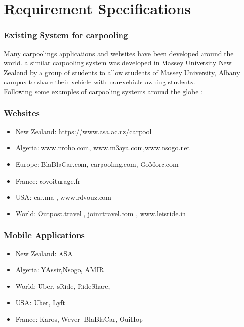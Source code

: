 \chapter{Requirement Specifications} \label{chap:reqs}

\subsection{Existing System for carpooling}
\justify
Many carpoolings applications and websites have been developed around the world. a similar carpooling system was developed in Massey University New Zealand by a group of students to allow students of Massey University, Albany campus to share their vehicle with non-vehicle owning students.
\\ Following some examples of carpooling systems around the globe : 

\subsection{Websites}
\begin{itemize}

\item New Zealand: https://www.asa.ac.nz/carpool
\item Algeria: www.nroho.com, www.m3aya.com,www.nsogo.net
\item Europe: BlaBlaCar.com, carpooling.com, GoMore.com
\item France: covoiturage.fr
\item USA: car.ma , www.rdvouz.com
\item World: Outpost.travel , joinntravel.com , www.letsride.in

\end{itemize}

\subsection{Mobile Applications}
\begin{itemize}

\item New Zealand: ASA
\item Algeria: YAssir,Nsogo, AMIR
\item World: Uber, sRide, RideShare, 
\item USA: Uber, Lyft
\item France: Karos, Wever, BlaBlaCar, OuiHop

\end{itemize}
